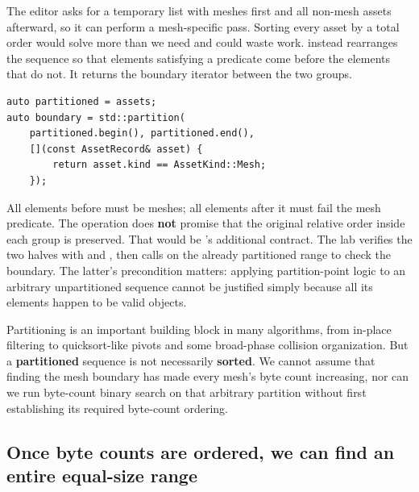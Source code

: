 \hypertarget{05-engine-i-ch006-sometimes-we-only-need-to-separate-meshes-from-textures-not-sort-everything}{}

The editor asks for a temporary list with meshes first and all non-mesh assets afterward, so it can perform a mesh-specific pass. Sorting every asset by a total order would solve more than we need and could waste work.  instead rearranges the sequence so that elements satisfying a predicate come before the elements that do not. It returns the boundary iterator between the two groups.

\begin{verbatim}
auto partitioned = assets;
auto boundary = std::partition(
    partitioned.begin(), partitioned.end(),
    [](const AssetRecord& asset) {
        return asset.kind == AssetKind::Mesh;
    });
\end{verbatim}

All elements before  must be meshes; all elements after it must fail the mesh predicate. The operation does \textbf{not} promise that the original relative order inside each group is preserved. That would be 's additional contract. The lab verifies the two halves with  and , then calls  on the already partitioned range to check the boundary. The latter's precondition matters: applying partition-point logic to an arbitrary unpartitioned sequence cannot be justified simply because all its elements happen to be valid objects.

Partitioning is an important building block in many algorithms, from in-place filtering to quicksort-like pivots and some broad-phase collision organization. But a \textbf{partitioned} sequence is not necessarily \textbf{sorted}. We cannot assume that finding the mesh boundary has made every mesh's byte count increasing, nor can we run byte-count binary search on that arbitrary partition without first establishing its required byte-count ordering.

\subsection{Once byte counts are ordered, we can find an entire equal-size range}\label{05-engine-i-ch006-once-byte-counts-are-ordered-we-can-find-an-entire-equal-size-range}

